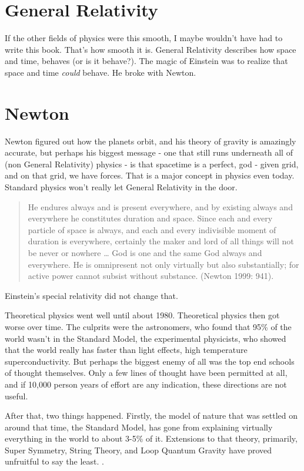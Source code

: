 \documentclass[../rzero]{subfiles}
\begin{document}
\section{General Relativity}
If the other fields of physics were this smooth, I maybe wouldn't have had to write this book. That's how smooth it is. General Relativity describes how space and time, behaves (or is it behave?). The magic of Einstein was to realize that space and time \textit{could} behave. He broke with Newton.


\section{Newton}
Newton figured out how the planets orbit, and his theory of gravity is amazingly accurate, but perhaps his biggest message - one that still runs underneath all of (non General Relativity) physics - is that spacetime is a perfect, god - given grid, and on that grid, we have forces. That is a major concept in physics even today. Standard physics won't really let General Relativity in the door.  

\begin{quotation}
	He endures always and is present everywhere, and by existing always and everywhere he constitutes duration and space. Since each and every particle of space is always, and each and every indivisible moment of duration is everywhere, certainly the maker and lord of all things will not be never or nowhere … God is one and the same God always and everywhere. He is omnipresent not only virtually but also substantially; for active power cannot subsist without substance. (Newton 1999: 941).
\end{quotation} 

Einstein's special relativity did not change that. 

Theoretical physics went well until about 1980. Theoretical physics then got worse over time. The culprits were the astronomers, who found that 95\% of the world wasn't in the Standard Model, the experimental physicists, who showed that the world really has faster than light effects, high temperature superconductivity. But perhaps the biggest enemy of all was the top end schools of thought themselves. Only a few lines of thought have been permitted at all, and if 10,000 person years of effort are any indication, these directions are not useful. 


After that, two things happened. Firstly, the model of nature that was settled on around that time, the Standard Model, has gone from explaining virtually everything in the world to about 3-5\% of it. Extensions to that theory, primarily, Super Symmetry, String Theory, and Loop Quantum Gravity have proved unfruitful to say the least. \cite{woit}\cite{SmolinTrouble}\cite{SabineLost}. 
\end{document}
